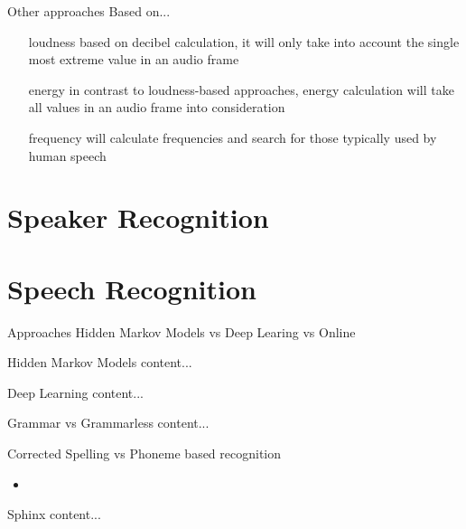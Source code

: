 \documentclass{beamer}
\begin{document}
	\begin{frame}{Other approaches}
		Based on...
		\begin{itemize}
			\item[loudness] based on decibel calculation, it will only take into account the single most extreme value in an audio frame
			\item[energy] in contrast to loudness-based approaches, energy calculation will take all values in an audio frame into consideration
			\item[frequency] will calculate frequencies and search for those typically used by human speech
		\end{itemize}
	\end{frame}
	
	\section{Speaker Recognition}%
	
	\section{Speech Recognition}%
	
	\begin{frame}{Approaches}
		Hidden Markov Models
		vs
		Deep Learing
		vs 
		Online
	\end{frame}
	
	\begin{frame}{Hidden Markov Models}
		content...
	\end{frame}
	
	\begin{frame}{Deep Learning}
		content...
	\end{frame}
	
	\begin{frame}{Grammar vs Grammarless}
		content...
	\end{frame}
	
	\begin{frame}{Corrected Spelling vs Phoneme based recognition}
		\begin{itemize}
			\item 
		\end{itemize}
	\end{frame}
	
	\begin{frame}{Sphinx}
		content...
	\end{frame}
	
\end{document}
